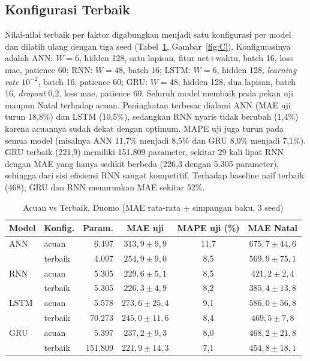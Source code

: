\documentclass[conference,a4paper]{IEEEtran}
\begin{document}
\subsection{Konfigurasi Terbaik}
Nilai-nilai terbaik per faktor digabungkan menjadi satu konfigurasi per model dan dilatih ulang dengan tiga seed (Tabel~\ref{tab:C}, Gambar~\ref{fig:C}). Konfigurasinya adalah ANN: $W=6$, hidden 128, satu lapisan, fitur net+waktu, batch 16, loss mae, patience 60; RNN: $W=48$, batch 16; LSTM: $W=6$, hidden 128, \emph{learning rate} $10^{-2}$, batch 16, patience 60; GRU: $W=48$, hidden 128, dua lapisan, batch 16, \emph{dropout} 0,2, loss mae, patience 60. Seluruh model membaik pada pekan uji maupun Natal terhadap acuan. Peningkatan terbesar dialami ANN (MAE uji turun 18,8\%) dan LSTM (10,5\%), sedangkan RNN nyaris tidak berubah (1,4\%) karena acuannya sudah dekat dengan optimum. MAPE uji juga turun pada semua model (misalnya ANN 11,7\% menjadi 8,5\% dan GRU 8,0\% menjadi 7,1\%). GRU terbaik (221,9) memiliki 151.809 parameter, sekitar 29 kali lipat RNN dengan MAE yang hanya sedikit berbeda (226,3 dengan 5.305 parameter), sehingga dari sisi efisiensi RNN sangat kompetitif. Terhadap baseline naif terbaik (468), GRU dan RNN menurunkan MAE sekitar 52\%.

\begin{table}[t]
\centering
\caption{Acuan vs Terbaik, Duomo (MAE rata-rata $\pm$ simpangan baku, 3 seed)}
\label{tab:C}
\footnotesize
\setlength{\tabcolsep}{2.5pt}
\begin{tabular}{@{}llrccc@{}}
\toprule
Model & Konfig. & Param. & MAE uji & MAPE uji (\%) & MAE Natal \\
\midrule
ANN  & acuan  & 6.497   & $313{,}9\pm9{,}9$  & 11,7 & $675{,}7\pm44{,}6$ \\
     & terbaik& 4.097   & $254{,}9\pm9{,}0$  & 8,5  & $569{,}9\pm75{,}1$ \\
RNN  & acuan  & 5.305   & $229{,}6\pm5{,}1$  & 8,5  & $421{,}2\pm2{,}4$ \\
     & terbaik& 5.305   & $226{,}3\pm4{,}9$  & 8,2  & $385{,}4\pm13{,}8$ \\
LSTM & acuan  & 5.578   & $273{,}6\pm25{,}4$ & 9,1  & $586{,}0\pm56{,}8$ \\
     & terbaik& 70.273  & $245{,}0\pm11{,}6$ & 8,4  & $469{,}5\pm7{,}8$ \\
GRU  & acuan  & 5.397   & $237{,}2\pm9{,}3$  & 8,0  & $468{,}2\pm21{,}8$ \\
     & terbaik& 151.809 & $221{,}9\pm14{,}3$ & 7,1  & $454{,}8\pm18{,}1$ \\
\bottomrule
\end{tabular}
\end{table}
\end{document}

